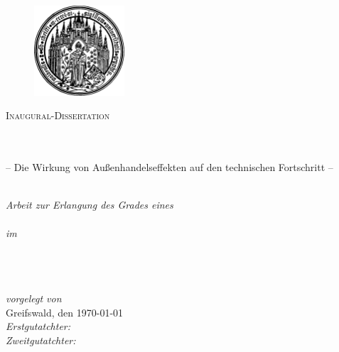 \documentclass[
10pt, %
twoside, %
chapterinoneline,%
onehalfspacing, %
nolistspacing, %
parskip, %
headsepline, %
ngerman
]{MastersDoctoralThesis} %
\author{Birgit Kirschbaum} %
\date{\today} %
\newcommand{\tilt}[1]{\textit{#1}}
\begin{document}
\frontmatter %

\pagestyle{plain} %


\begin{titlepage}
	
	\begin{figure}[h]
		\centering
		\includegraphics[width=0.3\textwidth]{images/logo.pdf} %
	\end{figure}
	
	\begin{center}
		
		{\scshape\LARGE \univname\par}\vspace{1.0cm} %
		\textsc{\Large Inaugural-Dissertation}\\[0.5cm] %
		
		\HRule \\[0.4cm] %
		{\huge \bfseries \ttitle}\\[0.3cm]
		{-- Die Wirkung von Außenhandelseffekten auf den technischen Fortschritt --\par}\vspace{0.25cm} %
		\HRule \\[1.5cm] %
				
		\large \textit{Arbeit zur Erlangung des Grades eines}\\ \degreename\\[0.3cm] %
		\textit{im}\\[0.4cm]
		\groupname\\[0.5cm] \deptname\\[0.5cm] %
		\facname \\[2.0cm]
		
	\end{center}
	
		\begin{flushleft} \large
			\tilt{vorgelegt von }\authorname \\ %
			Greifswald, den \today \\[1cm]
			\tilt{Erstgutatchter: }\supname \\ %
			\tilt{Zweitgutatchter: } \examname %
		\end{flushleft}
	
\end{titlepage}
\end{document}
